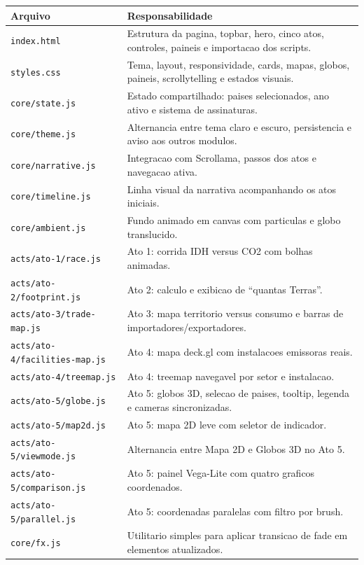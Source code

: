 \documentclass[12pt,a4paper]{article}
\begin{document}
\begin{longtable}{>{\raggedright\arraybackslash}p{5cm}>{\raggedright\arraybackslash}p{9cm}}
\toprule
\textbf{Arquivo} & \textbf{Responsabilidade} \\
\midrule
\texttt{index.html} & Estrutura da pagina, topbar, hero, cinco atos, controles, paineis e importacao dos scripts. \\
\texttt{styles.css} & Tema, layout, responsividade, cards, mapas, globos, paineis, scrollytelling e estados visuais. \\
\texttt{core/state.js} & Estado compartilhado: paises selecionados, ano ativo e sistema de assinaturas. \\
\texttt{core/theme.js} & Alternancia entre tema claro e escuro, persistencia e aviso aos outros modulos. \\
\texttt{core/narrative.js} & Integracao com Scrollama, passos dos atos e navegacao ativa. \\
\texttt{core/timeline.js} & Linha visual da narrativa acompanhando os atos iniciais. \\
\texttt{core/ambient.js} & Fundo animado em canvas com particulas e globo translucido. \\
\texttt{acts/ato-1/race.js} & Ato 1: corrida IDH versus CO2 com bolhas animadas. \\
\texttt{acts/ato-2/footprint.js} & Ato 2: calculo e exibicao de ``quantas Terras''. \\
\texttt{acts/ato-3/trade-map.js} & Ato 3: mapa territorio versus consumo e barras de importadores/exportadores. \\
\texttt{acts/ato-4/facilities-map.js} & Ato 4: mapa deck.gl com instalacoes emissoras reais. \\
\texttt{acts/ato-4/treemap.js} & Ato 4: treemap navegavel por setor e instalacao. \\
\texttt{acts/ato-5/globe.js} & Ato 5: globos 3D, selecao de paises, tooltip, legenda e cameras sincronizadas. \\
\texttt{acts/ato-5/map2d.js} & Ato 5: mapa 2D leve com seletor de indicador. \\
\texttt{acts/ato-5/viewmode.js} & Alternancia entre Mapa 2D e Globos 3D no Ato 5. \\
\texttt{acts/ato-5/comparison.js} & Ato 5: painel Vega-Lite com quatro graficos coordenados. \\
\texttt{acts/ato-5/parallel.js} & Ato 5: coordenadas paralelas com filtro por brush. \\
\texttt{core/fx.js} & Utilitario simples para aplicar transicao de fade em elementos atualizados. \\
\bottomrule
\end{longtable}
\end{document}
